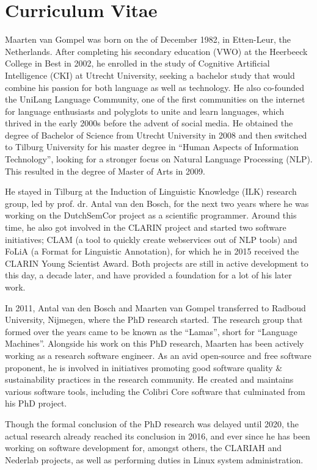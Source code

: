 \chapter*{Curriculum Vitae}

Maarten van Gompel was born on the  of December 1982, in Etten-Leur,
the Netherlands. After completing his secondary education (VWO) at the
Heerbeeck College in Best in 2002, he enrolled in the study of
Cognitive Artificial Intelligence (CKI) at Utrecht University,
seeking a bachelor study that would combine his
passion for both language as well as technology. He also
co-founded the UniLang Language Community, one of the first communities on the
internet for language enthusiasts and polyglots to unite and learn languages,
which thrived in the early 2000s before the advent of social media. He obtained
the degree of Bachelor of Science from Utrecht University in 2008 and then
switched to Tilburg University for his master degree in ``Human Aspects of
Information Technology'', looking for a stronger focus on Natural Language
Processing (NLP).  This resulted in the degree of Master of Arts in 2009.

He stayed in Tilburg at the Induction of Linguistic Knowledge (ILK) research
group, led by prof. dr. Antal van den Bosch, for the next two years where he was working on
the DutchSemCor project as a scientific programmer. Around this time, he also
got involved in the CLARIN project and started two software
initiatives; CLAM (a tool to quickly create webservices out of NLP tools) and
FoLiA (a Format for Linguistic Annotation), for which he in 2015 received the CLARIN Young Scientist Award. Both projects
are still in active development to this day, a decade later, and have provided a foundation for a lot of his later work.

In 2011, Antal van den Bosch and Maarten van Gompel transferred to Radboud
University, Nijmegen, where the PhD research started. The research group that
formed over the years came to be known as the ``Lamas'', short for ``Language
Machines''.  Alongside his work on this PhD research, Maarten has been actively
working as a research software engineer. As an avid open-source and free
software proponent, he is involved in initiatives promoting good software
quality \& sustainability practices in the research community. He created and
maintains various software tools, including the Colibri Core software that
culminated from his PhD project.

Though the formal conclusion of the PhD research was delayed until 2020, the
actual research already reached its conclusion in 2016, and ever since he has
been working on software development for, amongst others, the CLARIAH and
Nederlab projects, as well as performing duties in Linux system administration.
